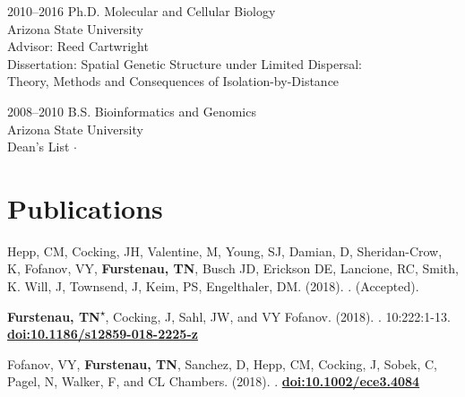\documentclass[]{cv-style}          %
\begin{document}
\begin{entrylist}
{2010--2016}
{Ph.D. Molecular and Cellular Biology}
{\\Arizona State University\\
Advisor: Reed Cartwright\\
Dissertation: Spatial Genetic Structure under Limited Dispersal:\\Theory, Methods and Consequences of Isolation-by-Distance
}
{\vspace{-0.3cm}}
     
{2008--2010}
{B.S. Bioinformatics and Genomics}
{\\Arizona State University\\
Dean's List $\cdotp$  }{\vspace{-0.3cm}}
\end{entrylist} 

 
\section{Publications}

Hepp, CM, Cocking, JH, Valentine, M, Young, SJ, Damian, D, Sheridan-Crow, K, Fofanov, VY, \textbf{Furstenau, TN}, Busch JD, Erickson DE, Lancione, RC, Smith, K. Will, J, Townsend, J, Keim, PS, Engelthaler, DM. (2018).  . (Accepted).

\textbf{Furstenau, TN}\textsuperscript{$\star$}, Cocking, J, Sahl, JW, and VY Fofanov. (2018).  . 10:222:1-13. \textbf{\href{https://doi.org/10.1186/s12859-018-2225-z}{doi:10.1186/s12859-018-2225-z}}

Fofanov, VY, \textbf{Furstenau, TN}\textsuperscript{\Letter}, Sanchez, D, Hepp, CM, Cocking, J, Sobek, C, Pagel, N, Walker, F, and CL Chambers. (2018).  . \textbf{\href{https://doi.org/10.1002/ece3.4084}{doi:10.1002/ece3.4084}}
\end{document}
